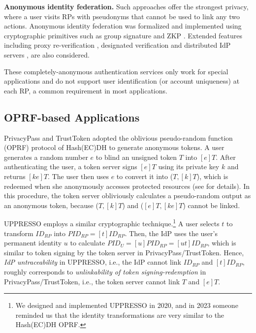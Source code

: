 %

\noindent\textbf{Anonymous identity federation.}
Such approaches offer the strongest privacy,
    where a user visits RPs with pseudonyms that cannot be used to link any two actions.
Anonymous identity federation was formalized \cite{WangWS13} and implemented using cryptographic primitives such as group signature and ZKP \cite{WangWS13, HanCSTWW20, HanCSTW18}.
Extended features including proxy re-verification \cite{HanCSTWW20}, designated verification \cite{HanCSTW18} and distributed IdP servers \cite{TSAPP}, are also considered. 

These completely-anonymous authentication services only work for special applications and do not support user identification (or account uniqueness) at each RP, a common requirement in most applications.

\subsection{OPRF-based Applications}
PrivacyPass and TrustToken \cite{privacypass,trusttoken} adopted the oblivious pseudo-random function (OPRF) protocol of Hash(EC)DH \cite{oprf-proved,voprf-proved} to generate anonymous tokens. %
A user generates a random number $e$ to blind an unsigned token $T$ into $[e]T$. After authenticating the user, a token server signs $[e]T$ using its private key $k$ and returns $[k e]T$. The user then uses $e$ to convert it into ($T, [k]T$),
        which is redeemed when she anonymously accesses protected resources
 (see \cite{privacypass,trusttoken} for details).
In this procedure, the token server obliviously calculates a pseudo-random output as an anonymous token,
    because ($T, [k]T$) and ($[e]T, [ke]T$) cannot be linked.


UPPRESSO employs a similar cryptographic technique.\footnote{We designed and implemented UPPRESSO in 2020, and in 2023 someone reminded us that the identity transformations are very similar to the Hash(EC)DH OPRF.} 
 A user selects $t$ to transform $ID_{RP}$ into $PID_{RP} = [t]ID_{RP}$.
Then, the IdP uses the user's permanent identity $u$ to calculate $PID_U = [u]PID_{RP} = [ut]ID_{RP}$,
which is similar to token signing by the token server in PrivacyPass/TrustToken.
Hence, \emph{IdP untraceability} in UPPRESSO, i.e., the IdP cannot link $ID_{RP}$ and $[t]ID_{RP}$,
 roughly corresponds to {\em unlinkability of token signing-redemption} in PrivacyPass/TrustToken, i.e., the token server cannot link $T$ and $[e]T$.

